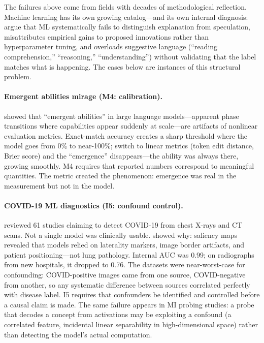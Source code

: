\documentclass[10pt]{article}
\begin{document}
The failures above come from fields with decades of methodological reflection. Machine learning has its own growing catalog---and its own internal diagnosis: \citet{lipton2019troubling} argue that ML systematically fails to distinguish explanation from speculation, misattributes empirical gains to proposed innovations rather than hyperparameter tuning, and overloads suggestive language (``reading comprehension,'' ``reasoning,'' ``understanding'') without validating that the label matches what is happening. The cases below are instances of this structural problem.

\paragraph{Emergent abilities mirage (M4: calibration).}
\citet{schaeffer2024emergent} showed that ``emergent abilities'' in large language models---apparent phase transitions where capabilities appear suddenly at scale---are artifacts of nonlinear evaluation metrics. Exact-match accuracy creates a sharp threshold where the model goes from 0\% to near-100\%; switch to linear metrics (token edit distance, Brier score) and the ``emergence'' disappears---the ability was always there, growing smoothly. M4 requires that reported numbers correspond to meaningful quantities. The metric created the phenomenon: emergence was real in the measurement but not in the model.

\paragraph{COVID-19 ML diagnostics (I5: confound control).}
\citet{roberts2021common} reviewed 61 studies claiming to detect COVID-19 from chest X-rays and CT scans. Not a single model was clinically usable. \citet{degrave2021ai} showed why: saliency maps revealed that models relied on laterality markers, image border artifacts, and patient positioning---not lung pathology. Internal AUC was 0.99; on radiographs from new hospitals, it dropped to 0.76. The datasets were near-worst-case for confounding: COVID-positive images came from one source, COVID-negative from another, so any systematic difference between sources correlated perfectly with disease label. I5 requires that confounders be identified and controlled before a causal claim is made. The same failure appears in MI probing studies: a probe that decodes a concept from activations may be exploiting a confound (a correlated feature, incidental linear separability in high-dimensional space) rather than detecting the model's actual computation.
\end{document}
